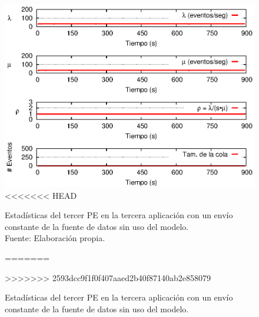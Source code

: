 \begin{figure}[!htp]
    \centering
    \captionsetup{justification=centering}
    \includegraphics[scale=1]{images/exp/app3/sm/logical/statusThreePE.eps}
<<<<<<< HEAD
    \caption[Estadísticas del tercer PE en la tercera aplicación con un envío constante de la fuente de datos sin uso del modelo.]{Estadísticas del tercer PE en la tercera aplicación con un envío constante de la fuente de datos sin uso del modelo.\\Fuente: Elaboración propia.}
=======
    \caption{Estad\'isticas del tercer PE en la tercera aplicaci\'on con un env\'io constante de la fuente de datos sin uso del modelo.}
>>>>>>> 2593dcc9f1f0f407aaed2b40f87140ab2e858079
    \label{fig:app3-statusThreePE-sm}
\end{figure}